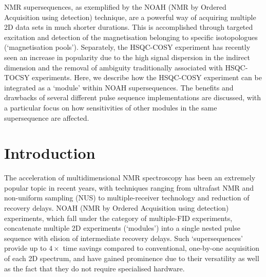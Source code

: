 \documentclass[a4paper,12pt]{article}
\newcommand{\proton}{\ch{^{1}H}}
\begin{document}
\begin{refsection}
NMR supersequences, as exemplified by the NOAH (NMR by Ordered Acquisition using \proton{} detection) technique, are a powerful way of acquiring multiple 2D data sets in much shorter durations.
This is accomplished through targeted excitation and detection of the magnetisation belonging to specific isotopologues (`magnetisation pools').
Separately, the HSQC-COSY experiment has recently seen an increase in popularity due to the high signal dispersion in the indirect dimension and the removal of ambiguity traditionally associated with HSQC-TOCSY experiments.
Here, we describe how the HSQC-COSY experiment can be integrated as a `module' within NOAH supersequences.
The benefits and drawbacks of several different pulse sequence implementations are discussed, with a particular focus on how sensitivities of other modules in the same supersequence are affected.

\clearpage

\section{Introduction}

The acceleration of multidimensional NMR spectroscopy has been an extremely popular topic in recent years, with techniques ranging from ultrafast NMR\autocite{Frydman2002PNASUSA,Pelupessy2003JACS,Frydman2003JACS} and non-uniform sampling (NUS)\autocite{Kazimierczuk2010PNMRS,Mobli2014PNMRS,Kazimierczuk2015MRC} to multiple-receiver technology\autocite{Kupce2006JACS,Kupce2008JACS,Kovacs2016MRC} and reduction of recovery delays\autocite{Kupce2007MRC,SchulzeSunninghausen2014JACS,Becker2019JMR}.
NOAH (NMR by Ordered Acquisition using \proton{} detection) experiments\autocite{Kupce2017ACIE}, which fall under the category of multiple-FID experiments\autocite{Yong2023RSCBook}, concatenate multiple 2D experiments (`modules') into a single nested pulse sequence with elision of intermediate recovery delays.
Such `supersequences' provide up to $4\times$ time savings compared to conventional, one-by-one acquisition of each 2D spectrum, and have gained prominence due to their versatility as well as the fact that they do not require specialised hardware.


\end{refsection}
\end{document}
